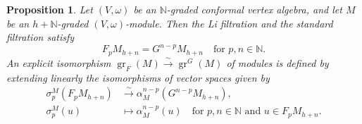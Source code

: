 \documentclass[a4paper, 12pt, reqno]{amsart}
\newtheorem{proposition}[theorem]{Proposition}
\theoremstyle{remark}
\DeclareMathOperator{\gr}{gr}
\begin{document}
\begin{proposition}
  \label{prp:18}
  Let $(V, \omega)$ be an $\mathbb{N}$-graded conformal vertex algebra, and let $M$ be an $h + \mathbb{N}$-graded $(V, \omega)$-module.
  Then the Li filtration and the standard filtration satisfy
  \begin{equation*}
    F_pM_{h + n} = G^{n - p}M_{h + n} \quad \text{for $p, n \in \mathbb{N}$}.
  \end{equation*}
  An explicit isomorphism $\gr_F(M) \xrightarrow{\sim} \gr^G(M)$ of modules is defined by extending linearly the isomorphisms of vector spaces given by
  \begin{align*}
    \sigma^M_p(F_pM_{h + n}) &\xrightarrow{\sim} \alpha^{n - p}_M(G^{n - p}M_{h + n}), \\
    \sigma^M_p(u) &\mapsto \alpha^{n - p}_M(u) \quad \text{for $p, n \in \mathbb{N}$ and $u \in F_pM_{h + n}$}.
  \end{align*}
\end{proposition}
\end{document}
